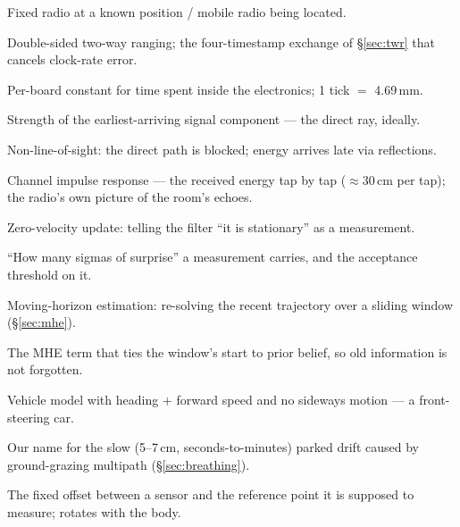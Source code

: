 \documentclass[11pt,a4paper]{article}
\begin{document}
\begin{description}[style=nextline]
\item[Anchor / tag] Fixed radio at a known position / mobile radio being located.
\item[DS-TWR] Double-sided two-way ranging; the four-timestamp exchange of
  \S\ref{sec:twr} that cancels clock-rate error.
\item[Antenna delay] Per-board constant for time spent inside the electronics;
  1 tick $=$ 4.69\,mm.
\item[First-path power] Strength of the earliest-arriving signal component ---
  the direct ray, ideally.
\item[NLOS] Non-line-of-sight: the direct path is blocked; energy arrives late
  via reflections.
\item[CIR] Channel impulse response --- the received energy tap by tap
  ($\approx$30\,cm per tap); the radio's own picture of the room's echoes.
\item[ZUPT] Zero-velocity update: telling the filter ``it is stationary'' as a
  measurement.
\item[NIS / $\chi^2$ gate] ``How many sigmas of surprise'' a measurement carries,
  and the acceptance threshold on it.
\item[MHE] Moving-horizon estimation: re-solving the recent trajectory over a
  sliding window (\S\ref{sec:mhe}).
\item[Arrival cost] The MHE term that ties the window's start to prior belief, so
  old information is not forgotten.
\item[Unicycle model] Vehicle model with heading + forward speed and no sideways
  motion --- a front-steering car.
\item[Breathing] Our name for the slow (5--7\,cm, seconds-to-minutes) parked
  drift caused by ground-grazing multipath (\S\ref{sec:breathing}).
\item[Lever arm] The fixed offset between a sensor and the reference point it is
  supposed to measure; rotates with the body.
\end{description}
\end{document}
